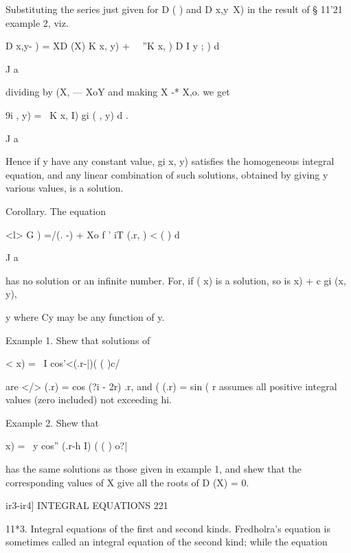 Substituting the series just given for D ( ) and D x,y\ X) in the
result of § 11'21 example 2, viz.

D x,y- ) = XD (X) K x, y) + \ \ ''K x, ) D I y ; ) d

J a

dividing by (X, — XoY and making X -* X,o. we get

9i , y) = \ K x, I) gi ( , y) d .

J a

Hence if y have any constant value, gi x, y) satisfies the homogeneous
integral equation, and any linear combination of such solutions,
obtained by giving y various values, is a solution.

Corollary. The equation

<l> G ) =/(. -) + Xo f ' iT (.r, ) < ( ) d

J a

has no solution or an infinite number. For, if ( x) is a solution, so
is x) + c gi (x, y),

y where Cy may be any function of y.

Example 1. Shew that solutions of

< x) = \ I cos'<(.r-|)( ( )c/

are </> (.r) = cos (?i - 2r) .r, and ( (.r) = sin (%
r assumes all positive integral values (zero included) not exceeding
hi.

Example 2. Shew that

  x) = \ y cos'' (.r-h I) ( ( ) o?|

has the same solutions as those given in example 1, and shew that the
corresponding values of X give all the roots of D (X) = 0.



ir3-ir4] INTEGRAL EQUATIONS 221

11*3. Integral equations of the first and second kinds. Fredholra's
equation is sometimes called an integral equation of the second kind;
while the equation

